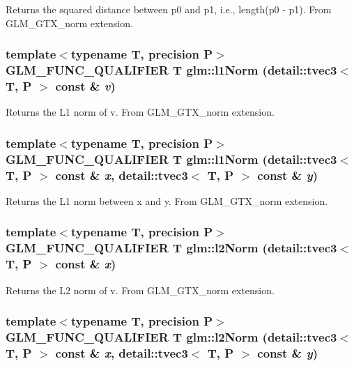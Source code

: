Returns the squared distance between p0 and p1, i.e., length(p0 - p1). From GLM\_\-GTX\_\-norm extension. \hypertarget{group__gtx__norm_g5a6d616a6e0340b9329d5018f04c1aca}{
\subsubsection[l1Norm]{\setlength{\rightskip}{0pt plus 5cm}template$<$typename T, precision P$>$ GLM\_\-FUNC\_\-QUALIFIER T glm::l1Norm (detail::tvec3$<$ T, P $>$ const \& {\em v})}}
\label{group__gtx__norm_g5a6d616a6e0340b9329d5018f04c1aca}


Returns the L1 norm of v. From GLM\_\-GTX\_\-norm extension. \hypertarget{group__gtx__norm_gf20fc187dfe66a474ecdba26e32ce4c6}{
\subsubsection[l1Norm]{\setlength{\rightskip}{0pt plus 5cm}template$<$typename T, precision P$>$ GLM\_\-FUNC\_\-QUALIFIER T glm::l1Norm (detail::tvec3$<$ T, P $>$ const \& {\em x}, \/  detail::tvec3$<$ T, P $>$ const \& {\em y})}}
\label{group__gtx__norm_gf20fc187dfe66a474ecdba26e32ce4c6}


Returns the L1 norm between x and y. From GLM\_\-GTX\_\-norm extension. \hypertarget{group__gtx__norm_g17bb46915f9694cbae612a7bae4c5116}{
\subsubsection[l2Norm]{\setlength{\rightskip}{0pt plus 5cm}template$<$typename T, precision P$>$ GLM\_\-FUNC\_\-QUALIFIER T glm::l2Norm (detail::tvec3$<$ T, P $>$ const \& {\em x})}}
\label{group__gtx__norm_g17bb46915f9694cbae612a7bae4c5116}


Returns the L2 norm of v. From GLM\_\-GTX\_\-norm extension. \hypertarget{group__gtx__norm_g2c87568b2888f01baf0133320c09b8ca}{
\subsubsection[l2Norm]{\setlength{\rightskip}{0pt plus 5cm}template$<$typename T, precision P$>$ GLM\_\-FUNC\_\-QUALIFIER T glm::l2Norm (detail::tvec3$<$ T, P $>$ const \& {\em x}, \/  detail::tvec3$<$ T, P $>$ const \& {\em y})}}
\label{group__gtx__norm_g2c87568b2888f01baf0133320c09b8ca}


